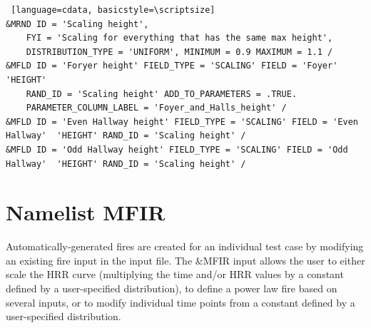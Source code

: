 \documentclass[12pt,twoside]{book}
\begin{document}
\vspace{\baselineskip}
\begin{lstlisting} [language=cdata, basicstyle=\scriptsize]
&MRND ID = 'Scaling height',
    FYI = 'Scaling for everything that has the same max height',
    DISTRIBUTION_TYPE = 'UNIFORM', MINIMUM = 0.9 MAXIMUM = 1.1 /
&MFLD ID = 'Foryer height' FIELD_TYPE = 'SCALING' FIELD = 'Foyer'  'HEIGHT'
    RAND_ID = 'Scaling height' ADD_TO_PARAMETERS = .TRUE.
    PARAMETER_COLUMN_LABEL = 'Foyer_and_Halls_height' /
&MFLD ID = 'Even Hallway height' FIELD_TYPE = 'SCALING' FIELD = 'Even Hallway'  'HEIGHT' RAND_ID = 'Scaling height' /
&MFLD ID = 'Odd Hallway height' FIELD_TYPE = 'SCALING' FIELD = 'Odd Hallway'  'HEIGHT' RAND_ID = 'Scaling height' /
\end{lstlisting}

\clearpage

\section{Namelist MFIR}
\label{info:MFIR}

Automatically-generated fires are created for an individual test case by modifying an existing fire input in the input file. The {\ct \&MFIR} input allows the user to either scale the HRR curve (multiplying the time and/or HRR values by a constant defined by a user-specified distribution), to define a power law fire based on several inputs, or to modify individual time points from a constant defined by a user-specified distribution.
\end{document}

